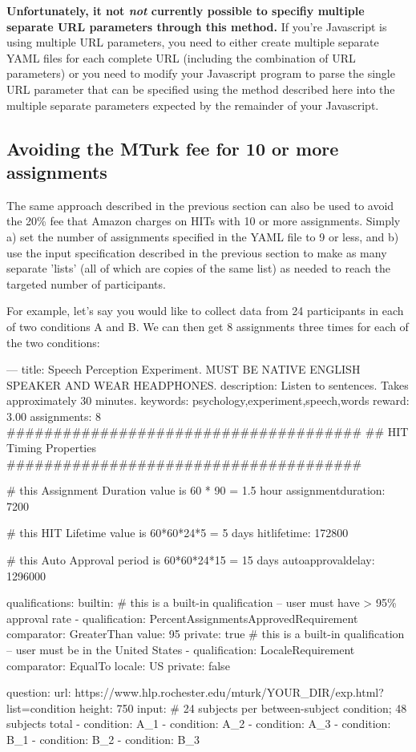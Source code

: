 \documentclass{article}
\newenvironment{code}%
   {\par\noindent\adjustbox{margin=1ex,bgcolor=shadecolor,margin=0ex \medskipamount}\bgroup\minipage\linewidth\verbatim}%
   {\endverbatim\endminipage\egroup}
\begin{document}
{\bf Unfortunately, it not {\em not} currently possible to specifiy multiple separate URL parameters through this method.} If you're Javascript is using multiple URL parameters, you need to either create multiple separate YAML files for each complete URL (including the combination of URL parameters) or you need to modify your Javascript program to parse the single URL parameter that can be specified using the method described here into the multiple separate parameters expected by the remainder of your Javascript.

\subsection{Avoiding the MTurk fee for 10 or more assignments} \label{sec:batchify}
The same approach described in the previous section can also be used to avoid the 20\% fee that Amazon charges on HITs with 10 or more assignments. Simply a) set the number of assignments specified in the YAML file to 9 or less, and b) use the input specification described in the previous section to make as many separate 'lists' (all of which are copies of the same list) as needed to reach the targeted number of participants.

For example, let's say you would like to collect data from 24 participants in each of two conditions A and B. We can then get 8 assignments three times for each of the two conditions:

\begin{code}
---
title: Speech Perception Experiment. MUST BE NATIVE ENGLISH SPEAKER AND WEAR HEADPHONES.
description: Listen to sentences. Takes approximately 30 minutes.
keywords: psychology,experiment,speech,words
reward: 3.00
assignments: 8
######################################
## HIT Timing Properties
######################################

# this Assignment Duration value is 60 * 90 = 1.5 hour
assignmentduration: 7200

# this HIT Lifetime value is 60*60*24*5 = 5 days
hitlifetime: 172800

# this Auto Approval period is 60*60*24*15 = 15 days
autoapprovaldelay: 1296000

qualifications:
  builtin:
    # this is a built-in qualification -- user must have > 95\% approval rate
    - qualification: PercentAssignmentsApprovedRequirement
      comparator: GreaterThan
      value: 95
      private: true
    # this is a built-in qualification -- user must be in the United States
    - qualification: LocaleRequirement
      comparator: EqualTo
      locale: US
      private: false

question:
  url: https://www.hlp.rochester.edu/mturk/YOUR_DIR/exp.html?list={condition}
  height: 750
  input:
  # 24 subjects per between-subject condition; 48 subjects total
    - condition: A_1
    - condition: A_2
    - condition: A_3
    - condition: B_1
    - condition: B_2
    - condition: B_3
\end{code}
\end{document}

